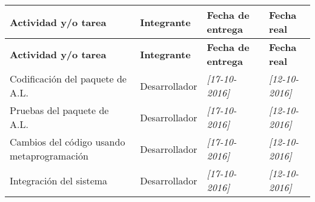 \documentclass[12pt]{report}
\numberwithin{equation}{section}
\begin{document}
\begin{flushleft}
\begin{longtable}[H]{|m{5cm}|m{3cm}|m{3cm}|m{3cm}|} 
\hline
\small{\textbf{Actividad y/o tarea }} &\small{ \textbf{Integrante}} & \small{\textbf{Fecha de entrega}} & \small{\textbf{Fecha real}}\\
\hline \hline
\endfirsthead

\hline
\small{\textbf{Actividad y/o tarea }} &\small{ \textbf{Integrante}} & \small{\textbf{Fecha de entrega}} & \small{\textbf{Fecha real}}\\
\hline \hline
\endhead
\hline
\endfoot

\endlastfoot
\hline
\hline
\small{Codificaci\'on del paquete de A.L.} & \small{Desarrollador} &\small{ \textit{[17-10-2016]}} & \small{\textit{[12-10-2016]}}\\
\hline
\small{Pruebas del paquete de A.L.} & \small{Desarrollador} &\small{ \textit{[17-10-2016]}} & \small{\textit{[12-10-2016]}}\\
\hline
\small{Cambios del código usando metaprogramaci\'on} & \small{Desarrollador} &\small{ \textit{[17-10-2016]}} & \small{\textit{[12-10-2016]}}\\
\hline
\small{Integraci\'on del sistema} & \small{Desarrollador} &\small{ \textit{[17-10-2016]}} & \small{\textit{[12-10-2016]}}\\
\hline
\hline
\end{longtable}


\end{flushleft}
\end{document}
